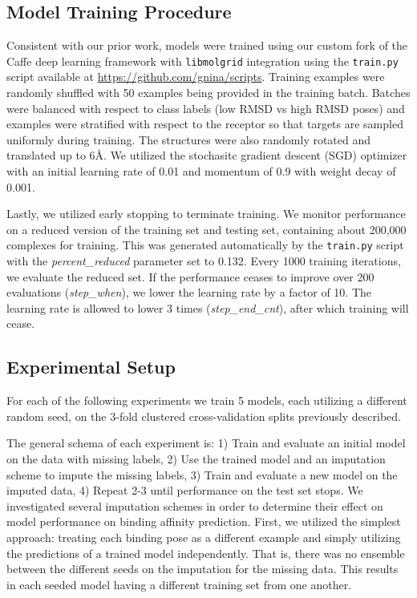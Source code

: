 \documentclass[journal=jmcmar,manuscript=article]{achemso}
\begin{document}
\subsection{Model Training Procedure}
Consistent with our prior work\cite{crossdocked2020}, models were trained using our custom fork of the Caffe deep learning framework \cite{jia2014caffe} with \texttt{libmolgrid} integration \cite{sunseri2019libmolgrid} using the \texttt{train.py} script available at \url{https://github.com/gnina/scripts}.
Training examples were randomly shuffled with 50 examples being provided in the training batch.
Batches were balanced with respect to class labels (low RMSD vs high RMSD poses) and examples were stratified with respect to the receptor so that targets are sampled uniformly during training.
The structures were also randomly rotated and translated up to 6{\AA}.
We utilized the stochasitc gradient descent (SGD) optimizer with an initial learning rate of 0.01 and momentum of 0.9 with weight decay of 0.001.

Lastly, we utilized early stopping to terminate training.
We monitor performance on a reduced version of the training set and testing set, containing about 200,000 complexes for training.
This was generated automatically by the \texttt{train.py} script with the \textit{percent\_reduced} parameter set to 0.132.
Every 1000 training iterations, we evaluate the reduced set.
If the performance ceases to improve over 200 evaluations (\textit{step\_when}), we lower the learning rate by a factor of 10.
The learning rate is allowed to lower 3 times (\textit{step\_end\_cnt}), after which training will cease.

\subsection{Experimental Setup}
For each of the following experiments we train 5 models, each utilizing a different random seed, on the 3-fold clustered cross-validation splits previously described.

The general schema of each experiment is: 1) Train and evaluate an initial model on the data with missing labels, 2) Use the trained model and an imputation scheme to impute the missing labels, 3) Train and evaluate a new model on the imputed data, 4) Repeat 2-3 until performance on the test set stops.
We investigated several imputation schemes in order to determine their effect on model performance on binding affinity prediction.
First, we utilized the simplest approach: treating each binding pose as a different example and simply utilizing the predictions of a trained model independently.
That is, there was no ensemble between the different seeds on the imputation for the missing data.
This results in each seeded model having a different training set from one another.
\end{document}
